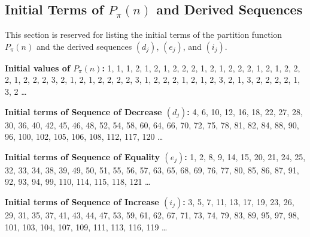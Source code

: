 \documentclass[]{article}
\theoremstyle{plain}%
\theoremstyle{definition}
\theoremstyle{remark}
\begin{document}
\subsection{Initial Terms of $P_{\pi}(n)$ and Derived Sequences}
\label{subsec:initial_terms}
This section is reserved for listing the initial terms of the partition function $P_{\pi}(n)$ and the derived sequences $(d_j)$, $(e_j)$, and $(i_j)$.

\noindent \textbf{Initial values of $P_{\pi}(n)$:}
1, 1, 1, 2, 1, 2, 1, 2, 2, 2, 1, 2, 1, 2, 2, 2, 1, 2, 1, 2, 2, 2, 1, 2, 2, 2, 3, 2, 1, 2, 1, 2, 2, 2, 2, 3, 1, 2, 2, 2, 1, 2, 1, 2, 3, 2, 1, 3, 2, 2, 2, 2, 1, 3, 2 \dots

\noindent \textbf{Initial terms of Sequence of Decrease $(d_j)$:}
4, 6, 10, 12, 16, 18, 22, 27, 28, 30, 36, 40, 42, 45, 46, 48, 52, 54, 58, 60, 64, 66, 70, 72, 75, 78, 81, 82, 84, 88, 90, 96, 100, 102, 105, 106, 108, 112, 117, 120 \dots

\noindent \textbf{Initial terms of Sequence of Equality $(e_j)$:}
1, 2, 8, 9, 14, 15, 20, 21, 24, 25, 32, 33, 34, 38, 39, 49, 50, 51, 55, 56, 57, 63, 65, 68, 69, 76, 77, 80, 85, 86, 87, 91, 92, 93, 94, 99, 110, 114, 115, 118, 121 \dots

\noindent \textbf{Initial terms of Sequence of Increase $(i_j)$:}
3, 5, 7, 11, 13, 17, 19, 23, 26, 29, 31, 35, 37, 41, 43, 44, 47, 53, 59, 61, 62, 67, 71, 73, 74, 79, 83, 89, 95, 97, 98, 101, 103, 104, 107, 109, 111, 113, 116, 119 \dots
\end{document}
